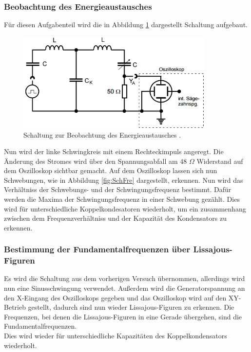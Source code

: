 \subsubsection{Beobachtung des Energieaustausches}
 Für diesen Aufgabenteil wird die in Abbildung \ref{fig:Blub} dargestellt Schaltung aufgebaut.

 \begin{figure}[H]
   \centering
   \includegraphics[height=5cm]{picture/Schwebefrequenz.PNG}
   \caption{Schaltung zur Beobachtung des Energieaustausches \cite{sample}.}
   \label{fig:Blub}
 \end{figure}

Nun wird der linke Schwingkreis mit einem Rechteckimpuls angeregt. Die Änderung des Stromes wird über den Spannungsabfall am 48 $\Omega$ Widerstand auf dem Oszilloskop sichtbar gemacht. Auf dem Oszilloskop lassen sich nun Schwebungen, wie in Abbildung \ref{fig:SchFre} dargestellt, erkennen. Nun wird das Verhältniss der Schwebungs- und der Schwingungsfrequenz bestimmt. Dafür werden die Maxima der Schwingungsfrequenz in einer Schwebung gezählt. Dies wird für unterschiedliche Koppelkondesatoren wiederholt, um ein zusammenhang zwischen dem Frequenzverhältniss und der Kapazität des Kondensators zu erkennen.

\subsubsection{Bestimmung der Fundamentalfrequenzen über Lissajous-Figuren}
Es wird die Schaltung aus dem vorherigen Versuch übernommen, allerdings wird nun eine Sinusschwingung verwendet. Außerdem wird die Generatorspannung an den X-Eingang des Oszilloskops gegeben und das Oszilloskop wird auf den XY-Betrieb gestellt, dadurch sind nun wieder Lissajous-Figuren zu erkennen. Die Frequenzen, bei denen die Lissajous-Figuren in eine Gerade übergehen, sind die Fundamentalfrequenzen.\\
Dies wird wieder für unterschiedliche Kapazitäten des Koppelkondensators wiederholt.

